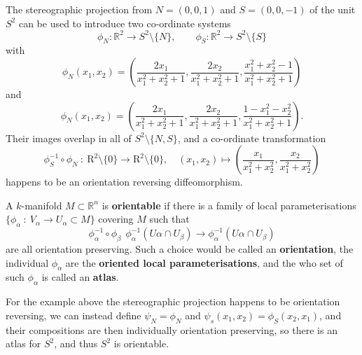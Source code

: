 \documentclass[letter-paper]{tufte-book}
\newenvironment{example}[1][Example]{\begin{trivlist}
\item[\hskip \labelsep {\bfseries #1}]}{\end{trivlist}}
\begin{document}
\begin{example}
  The stereographic projection from $N = (0, 0, 1)$ and $S = (0, 0, -1)$ of the unit $S^2$ can be used to introduce two co-ordinate systems
  \begin{equation*}
    \phi_N : \mathbb{R}^2 \to S^2 \setminus \{N\}, \qquad \phi_S : \mathbb{R}^2 \to S^2 \setminus \{S\}
  \end{equation*}
  with
  \begin{equation}
    \phi_N(x_1, x_2) = \left(\frac{2x_1}{x_1^2 + x_2^2 + 1}, \frac{2x_2}{x_1^2 + x_2^2 + 1}, \frac{x_1^2 + x_2^2 - 1}{x_1^2 + x_2^2 + 1}\right)
  \end{equation}
  and
  \begin{equation}
    \phi_N(x_1, x_2) = \left(\frac{2x_1}{x_1^2 + x_2^2 + 1}, \frac{2x_2}{x_1^2 + x_2^2 + 1}, \frac{1 - x_1^2 - x_2^2}{x_1^2 + x_2^2 + 1}\right).
  \end{equation}
  Their images overlap in all of $S^2 \setminus \{N, S\}$, and a co-ordinate transformation
  \begin{equation*}
    \phi_S^{-1} \circ \phi_N\ :\ \mathrm{R}^2 \setminus \{0\} \to \mathrm{R}^2 \setminus \{0\}, \quad (x_1, x_2) \mapsto \left(\frac{x_1}{x_1^2 + x_2^2}, \frac{x_2}{x_1^2 + x_2^2}\right)
  \end{equation*}
  happens to be an orientation reversing diffeomorphism.
\end{example}

A $k$-manifold $M \subset \mathbb{R}^n$ is \textbf{orientable} if there is a family of local parameterisations $\{ \phi_\alpha\ :\ V_\alpha \to U_\alpha \subset M\}$ covering $M$ such that
\begin{equation*}
  \phi_\alpha^{-1} \circ \phi_\beta\: \ \phi_\alpha^{-1}(U\alpha \cap U_\beta) \to \phi_\alpha^{-1}(U\alpha \cap U_\beta)
\end{equation*}
are all orientation preserving. Such a choice would be called an \textbf{orientation}, the individual $\phi_\alpha$ are the \textbf{oriented local parameterisations}, and the who set of such $\phi_\alpha$ is called an \textbf{atlas}.

\begin{example}
  For the example above the stereographic projection happens to be orientation reversing, we can instead define $\psi_N = \phi_N$ and $\psi_s(x_1, x_2) = \phi_S(x_2, x_1)$, and their compositions are then individually orientation preserving, so there is an atlas for $S^2$, and thus $S^2$ is orientable.
\end{example}
\end{document}
